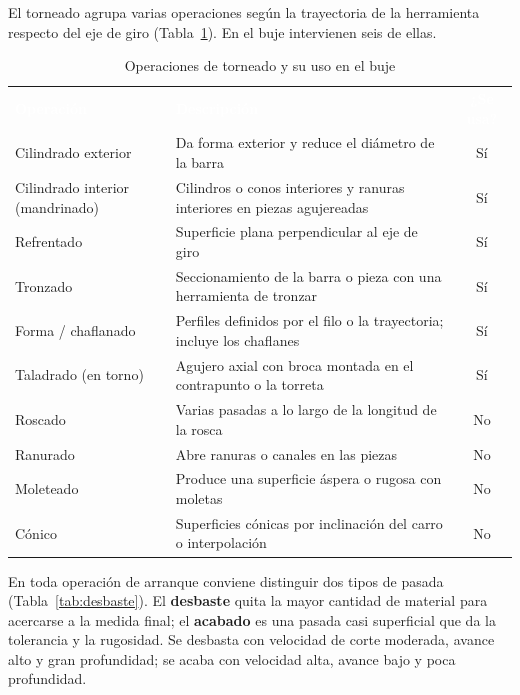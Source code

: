 \documentclass[12pt,a4paper]{article}
\newcommand{\encab}[1]{\textcolor{white}{\sffamily\bfseries #1}}
\begin{document}
El torneado agrupa varias operaciones según la trayectoria de la herramienta
respecto del eje de giro (Tabla~\ref{tab:operaciones}). En el buje intervienen
seis de ellas.

\begin{table}[!htb]
	\centering
	\caption{Operaciones de torneado y su uso en el buje}\label{tab:operaciones}
	\small
	\begin{tabularx}{\linewidth}{l X c}
		\rowcolor{darkblue}
		\encab{Operación}                & \encab{Descripción}
		                                 & \encab{¿Se usa?}
		\\
		Cilindrado exterior              & Da forma exterior y reduce el diámetro de
		la barra                         & Sí                                                                           \\
		Cilindrado interior (mandrinado) & Cilindros o conos interiores y ranuras interiores en piezas agujereadas & Sí \\
		Refrentado                       & Superficie plana perpendicular al eje de giro                           & Sí \\
		Tronzado                         & Seccionamiento de la barra o pieza con una herramienta de tronzar       & Sí \\
		Forma / chaflanado               & Perfiles definidos por el filo o la trayectoria; incluye los chaflanes  & Sí \\
		Taladrado (en torno)             & Agujero axial con broca montada en el
		contrapunto o la torreta         & Sí
		\\
		Roscado                          & Varias pasadas a lo largo de la longitud de la rosca                    & No \\
		Ranurado                         & Abre ranuras o canales en las piezas                                    & No \\
		Moleteado                        & Produce una superficie áspera o rugosa con moletas                      & No \\
		Cónico                           & Superficies cónicas por inclinación del carro o interpolación           & No \\
	\end{tabularx}
\end{table}

En toda operación de arranque conviene distinguir dos tipos de pasada
(Tabla~\ref{tab:desbaste}). El \textbf{desbaste} quita la mayor cantidad de
material para acercarse a la medida final; el \textbf{acabado} es una pasada casi
superficial que da la tolerancia y la rugosidad. Se desbasta con velocidad de
corte moderada, avance alto y gran profundidad; se acaba con velocidad alta,
avance bajo y poca profundidad.
\end{document}
